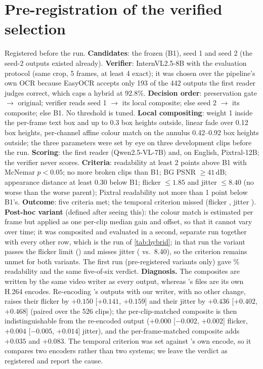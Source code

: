 \section{Pre-registration of the verified selection}
\label{sec:supp_prereg_hybrid}
Registered before the run. \textbf{Candidates}: the frozen \method (B1), \steer seed 1 and seed 2 (the seed-2 outputs existed already). \textbf{Verifier}: InternVL2.5-8B with the evaluation protocol (same crop, 5 frames, at least 4 exact); it was chosen over the pipeline's own OCR because EasyOCR accepts only 193 of the 442 \steer outputs the first reader judges correct, which caps a hybrid at 92.8\%. \textbf{Decision order}: preservation gate $\to$ original; verifier reads seed 1 $\to$ its local composite; else seed 2 $\to$ its composite; else B1. No threshold is tuned. \textbf{Local compositing}: weight 1 inside the per-frame text box and up to 0.3 box heights outside, linear fade over 0.12 box heights, per-channel affine colour match on the annulus 0.42--0.92 box heights outside; the three parameters were set by eye on three development clips before the run. \textbf{Scoring}: the first reader (Qwen2.5-VL-7B) and, on English, Pixtral-12B; the verifier never scores. \textbf{Criteria}: readability at least 2 points above B1 with McNemar $p<0.05$; no more broken clips than B1; BG PSNR $\geq 41$\,dB; appearance distance at least 0.30 below B1; flicker $\leq 1.85$ and jitter $\leq 8.40$ (no worse than the worse parent); Pixtral readability not more than 1 point below B1's. \textbf{Outcome}: five criteria met; the temporal criterion missed (flicker \hVFlicker, jitter \hVJitter). \textbf{Post-hoc variant} (defined after seeing this): the colour match is estimated per frame but applied as one per-clip median gain and offset, so that it cannot vary over time; it was composited and evaluated in a second, separate run together with every other row, which is the run of \cref{tab:hybrid}; in that run the variant passes the flicker limit (\hVCFlicker) and misses jitter (\hVCJitter{} vs.\ 8.40), so the criterion remains unmet for both variants. The first run (pre-registered variants only) gave \hVRead\% readability and the same five-of-six verdict. \textbf{Diagnosis.} The composites are written by the same video writer as every \method output, whereas \steer's files are its own H.264 encodes. Re-encoding \steer's outputs with our writer, with no other change, raises their flicker by $+0.150$ [$+0.141$, $+0.159$] and their jitter by $+0.436$ [$+0.402$, $+0.468$] (paired over the 526 clips); the per-clip-matched composite is then indistinguishable from the re-encoded \steer output ($+0.000$ [$-0.002$, $+0.002$] flicker, $+0.004$ [$-0.005$, $+0.014$] jitter), and the per-frame-matched composite adds $+0.035$ and $+0.083$. The temporal criterion was set against \steer's own encode, so it compares two encoders rather than two systems; we leave the verdict as registered and report the cause.

